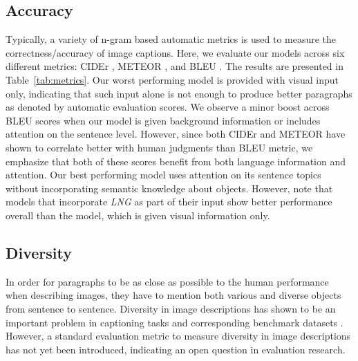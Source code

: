 \documentclass[11pt,a4paper]{article}
\begin{document}

\subsection{Accuracy}
Typically, a variety of n-gram based automatic metrics is used to measure the correctness/accuracy of image captions.
Here, we evaluate our models across six different metrics: CIDEr \cite{vedantam2014cider}, METEOR \cite{meteor14}, and BLEU \cite{bleu}.
The results are presented in Table~\ref{tab:metrics}.
Our worst performing model is provided with visual input only, indicating that such input alone is not enough to produce better paragraphs as denoted by automatic evaluation scores.
We observe a minor boost across BLEU scores when our model is given background information or includes attention on the sentence level.
However, since both CIDEr and METEOR have shown to correlate better with human judgments than BLEU metric, we emphasize that both of these scores benefit from both language information and attention.
Our best performing model uses attention on its sentence topics without incorporating semantic knowledge about objects.
However, note that models that incorporate \textit{LNG} as part of their input show better performance overall than the model, which is given visual information only.

\subsection{Diversity}
In order for paragraphs to be as close as possible to the human performance when describing images, they have to mention both various and diverse objects from sentence to sentence.
Diversity in image descriptions has shown to be an important problem in captioning tasks and corresponding benchmark datasets \cite{devlin2015language,lindh_generating_2018}.
However, a standard evaluation metric to measure diversity in image descriptions has not yet been introduced, indicating an open question in evaluation research.
\end{document}
